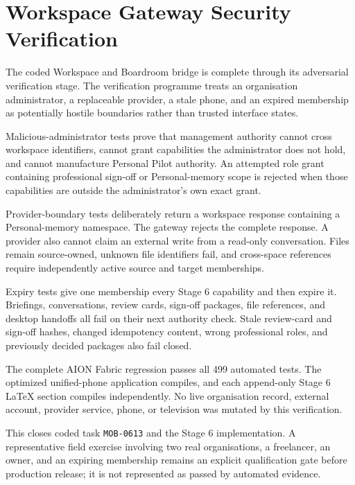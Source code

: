 \section{Workspace Gateway Security Verification}
\label{sec:pilot-mobile-workspace-security-verification}
\raggedright

The coded Workspace and Boardroom bridge is complete through its adversarial verification stage.
The verification programme treats an organisation administrator, a replaceable provider, a stale
phone, and an expired membership as potentially hostile boundaries rather than trusted interface
states.

Malicious-administrator tests prove that management authority cannot cross workspace identifiers,
cannot grant capabilities the administrator does not hold, and cannot manufacture Personal Pilot
authority.  An attempted role grant containing professional sign-off or Personal-memory scope is
rejected when those capabilities are outside the administrator's own exact grant.

Provider-boundary tests deliberately return a workspace response containing a Personal-memory
namespace.  The gateway rejects the complete response.  A provider also cannot claim an external
write from a read-only conversation.  Files remain source-owned, unknown file identifiers fail,
and cross-space references require independently active source and target memberships.

Expiry tests give one membership every Stage 6 capability and then expire it.  Briefings,
conversations, review cards, sign-off packages, file references, and desktop handoffs all fail on
their next authority check.  Stale review-card and sign-off hashes, changed idempotency content,
wrong professional roles, and previously decided packages also fail closed.

The complete AION Fabric regression passes all 499 automated tests.  The optimized unified-phone
application compiles, and each append-only Stage 6 LaTeX section compiles independently.  No live
organisation record, external account, provider service, phone, or television was mutated by this
verification.

This closes coded task \texttt{MOB-0613} and the Stage 6 implementation.  A representative field
exercise involving two real organisations, a freelancer, an owner, and an expiring membership
remains an explicit qualification gate before production release; it is not represented as passed
by automated evidence.

